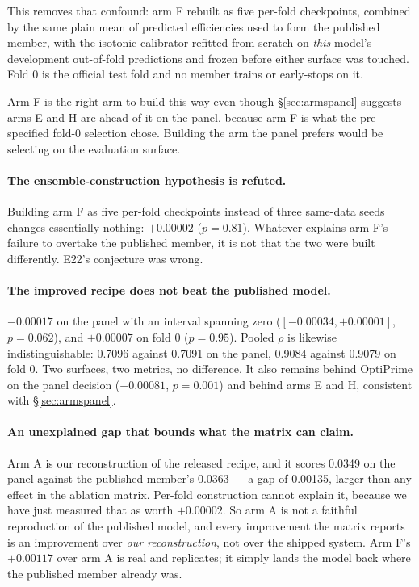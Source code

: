 \documentclass[11pt]{article}
\begin{document}
This removes that confound: arm F rebuilt as five per-fold checkpoints, combined by the same
plain mean of predicted efficiencies used to form the published member, with the isotonic
calibrator refitted from scratch on \emph{this} model's development out-of-fold predictions
and frozen before either surface was touched. Fold 0 is the official test fold and no member
trains or early-stops on it.

Arm F is the right arm to build this way even though \S\ref{sec:armspanel} suggests arms E
and H are ahead of it on the panel, because arm F is what the pre-specified fold-0 selection
chose. Building the arm the panel prefers would be selecting on the evaluation surface.



\paragraph{The ensemble-construction hypothesis is refuted.}
Building arm F as five per-fold checkpoints instead of three same-data seeds changes
essentially nothing: $+0.00002$ ($p = 0.81$). Whatever explains arm F's failure to overtake
the published member, it is not that the two were built differently. E22's conjecture was
wrong.

\paragraph{The improved recipe does not beat the published model.}
$-0.00017$ on the panel with an interval spanning zero ($[-0.00034, +0.00001]$, $p = 0.062$),
and $+0.00007$ on fold 0 ($p = 0.95$). Pooled $\rho$ is likewise indistinguishable: 0.7096
against 0.7091 on the panel, 0.9084 against 0.9079 on fold 0. Two surfaces, two metrics, no
difference. It also remains behind OptiPrime on the panel decision ($-0.00081$, $p = 0.001$)
and behind arms E and H, consistent with \S\ref{sec:armspanel}.

\paragraph{An unexplained gap that bounds what the matrix can claim.}
Arm A is our reconstruction of the released recipe, and it scores 0.0349 on the panel against
the published member's 0.0363 --- a gap of 0.00135, larger than any effect in the ablation
matrix. Per-fold construction cannot explain it, because we have just measured that as worth
$+0.00002$. So arm A is not a faithful reproduction of the published model, and every
improvement the matrix reports is an improvement over \emph{our reconstruction}, not over the
shipped system. Arm F's $+0.00117$ over arm A is real and replicates; it simply lands the
model back where the published member already was.
\end{document}
